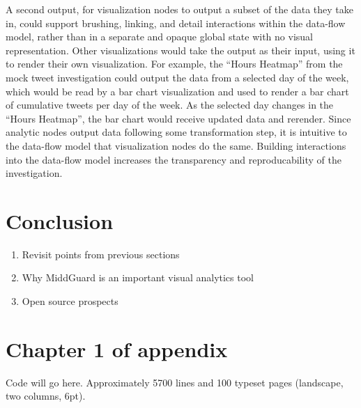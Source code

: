 \documentclass[midd]{thesis}
\begin{document}
A second output, for visualization nodes to output a subset of the data they
take in, could support brushing, linking, and detail interactions within the
data-flow model, rather than in a separate and opaque global state with no
visual representation. Other visualizations would take the output as their
input, using it to render their own visualization. For example, the ``Hours
Heatmap'' from the mock tweet investigation could output the data from a
selected  day of the week, which would be read by a bar chart visualization and
used to render a bar chart of cumulative tweets per day of the week. As the
selected day changes in the ``Hours Heatmap'', the bar chart would receive
updated data and rerender. Since analytic nodes output data following some
transformation step, it is intuitive to the data-flow model that visualization
nodes do the same. Building interactions into the data-flow model increases the
transparency and reproducability of the investigation.

\chapter{Conclusion}
  \begin{enumerate}
    \item Revisit points from previous sections
    \item Why MiddGuard is an important visual analytics tool
    \item Open source prospects
  \end{enumerate}

\appendix
\chapter{Chapter 1 of appendix}

Code will go here. Approximately 5700 lines and 100 typeset pages (landscape,
two columns, 6pt).


\end{document}
